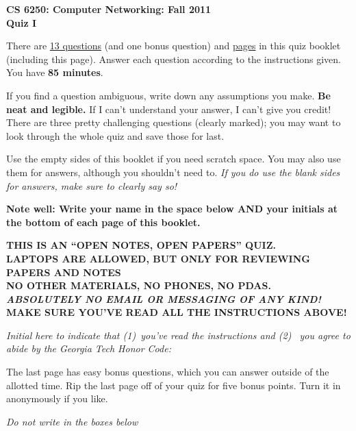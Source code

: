 \documentclass[11pt]{article}
\begin{document}
\begin{center}
{\Large{\bf CS 6250: Computer Networking: Fall 2011} \\
 \vspace{.15in} \Huge{\bf Quiz I}} 

\begin{boxedminipage}[h]{6in}
There are \underline{13 questions} (and one bonus question) and
  \underline{\pageref{lastpage} pages} in this quiz booklet (including
  this page).  Answer each question according to the instructions given.
  You have {\bf 85 minutes}.



\vspace{.1in} 
If you find a question ambiguous, write down any
assumptions you make.  {\bf Be neat and legible.}  If I can't
understand your answer, I can't give you credit!  There are three pretty
challenging questions (clearly marked); you may want to look through the
whole quiz and save those for last.

\vspace{.1in} 
Use the empty sides of this booklet if you need scratch space.  You
may also use them for answers, although you shouldn't need to.  {\em If you
do use the blank sides for answers, make sure to clearly say so!}

\vspace{.1in} 
{\bf Note well: Write your name in the space below AND your initials at the bottom of each
page of this booklet.}

\begin{center}{\bf THIS IS AN ``OPEN NOTES, OPEN PAPERS'' QUIZ.\\
LAPTOPS ARE ALLOWED, BUT ONLY FOR REVIEWING PAPERS AND NOTES \\
NO OTHER MATERIALS, NO PHONES, NO PDAS.\\
{\em ABSOLUTELY NO EMAIL OR MESSAGING OF ANY KIND!} \\
MAKE SURE YOU'VE READ ALL THE INSTRUCTIONS ABOVE!}
\end{center}
{\em Initial here to indicate that (1)~you've read the instructions and (2)~
you agree to abide by the Georgia Tech Honor Code: }

\vspace{.1in} The last page has easy bonus questions, which you can
answer outside of the allotted time.  Rip the last page off of your
quiz for five bonus points.  Turn it in anonymously if you like.

\end{boxedminipage}
\end{center}
\vspace*{0.25in}
\begin{center}
{\it Do not write in the boxes below}
\end{center}
\end{document}
